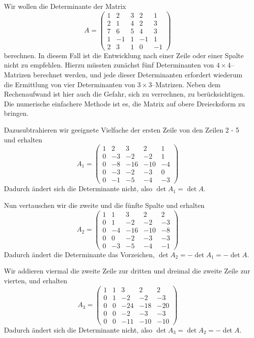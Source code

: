 \begin{beispiel} Wir wollen die Determinante der Matrix
  	$$ A = \left( \begin{matrix} 1 & 2 & 3 & 2 & 1 \\ 2 & 1 & 4 & 2 & 3 \\ 
    	7 & 6 & 5 & 4 & 3 \\ 1 & -1 & 1 & -1 & 1 \\ 2 & 3 & 1 & 0 & -1 \end{matrix} \right) $$
berechnen. In diesem Fall ist die Entwicklung nach einer Zeile oder einer Spalte nicht zu empfehlen. 
Hierzu müssten zunächst fünf Determinanten von $4 \times 4$--Matrizen berechnet werden, und jede dieser 
Determinanten erfordert wiederum die Ermittlung von vier Determinanten von $3 \times 3$--Matrizen. 
Neben dem Rechenaufwand ist hier auch die Gefahr, sich zu verrechnen, zu berücksichtigen.
Die numerische einfachere Methode ist es, die Matrix auf obere Dreiecksform zu bringen.

Dazusubtrahieren wir geeignete Vielfache der ersten Zeile von den Zeilen 2 - 5 und erhalten 
  	$$ A_1 = \left( \begin{matrix} 1 & 2 & 3 & 2 & 1 \\ 0 & -3 & -2 & - 2 & 1 \\ 
     	0 & - 8 & -16 & -10 & -4 \\0 & -3 & -2 & -3 & 0  \\ 0 & -1 & -5 & -4 & -3 \end{matrix} \right) $$
Dadurch ändert sich die  Determinante nicht, also $\det{A_1}= \det{A}$. 

Nun vertauschen wir die zweite und die fünfte Spalte und erhalten
  	$$ A_2 = \left( \begin{matrix} 1 & 1 & 3 & 2 & 2 \\ 0 & 1 & -2 & - 2 & -3\\ 
  	0 & -4 & -16 & -10 & -8 \\0 & 0 & -2 & -3 & -3  \\ 0 & -3 & -5 & -4 & -1 \end{matrix} \right) $$
Dadurch ändert die Determinante das Vorzeichen, $\det{A_2} = -\det{A_1} = -\det{A}$.

Wir addieren viermal die zweite Zeile zur dritten und dreimal die zweite Zeile zur vierten, und erhalten
  	$$ A_3 = \left( \begin{matrix} 1 & 1 & 3 & 2 & 2 \\ 0 & 1 & -2 & - 2 & -3\\ 
    	0 & 0 & -24 & -18 & -20 \\0 & 0 & -2 & -3 & -3  \\ 0 & 0 & -11 & -10 & -10 \end{matrix} 
    	\right) $$
Dadurch ändert sich die  Determinante nicht, also $\det{A_3} = \det{A_2} = - \det{A}$. 


\end{beispiel}
